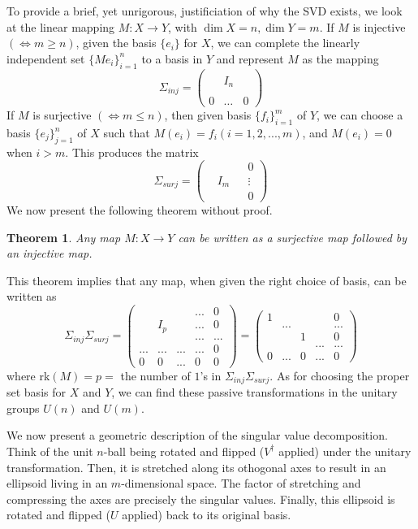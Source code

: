 \documentclass{article}
\newtheorem{theorem}{Theorem}[section]
\theoremstyle{remark}
\theoremstyle{definition}
\begin{document}
To provide a brief, yet unrigorous, justificiation of why the SVD exists, we look at the linear mapping $M: X \longrightarrow Y$, with $\dim{X} = n, \dim{Y} = m$. If $M$ is injective $(\iff m \geq n)$, given the basis $\{e_i\}$ for $X$, we can complete the linearly independent set $\{Me_i\}_{i=1}^n$ to a basis in $Y$ and represent $M$ as the mapping
\[\Sigma_{inj} = \begin{pmatrix}
&&\\
&I_n&\\
&&\\
0&\ldots &0
\end{pmatrix}\]
If $M$ is surjective $(\iff m \leq n)$, then given basis $\{f_i\}_{i=1}^m$ of $Y$, we can choose a basis $\{e_j\}_{j=1}^n$ of $X$ such that $M(e_i) = f_i (i = 1, 2, ..., m)$, and $M(e_i) = 0$ when $i > m$. This produces the matrix
\[\Sigma_{surj} = \begin{pmatrix}
&&&0\\&I_m&& \vdots \\&&&0\end{pmatrix}\]
We now present the following theorem without proof. 

\begin{theorem}
Any map $M: X \longrightarrow Y$ can be written as a surjective map followed by an injective map. 
\end{theorem}

This theorem implies that any map, when given the right choice of basis, can be written as 
\[ \Sigma_{inj} \Sigma_{surj} = \begin{pmatrix}
&&&...&0\\
&I_p&&...&0\\
&&&...&...\\
...&...&...&...&0\\
0&0&...&0&0
\end{pmatrix} = \begin{pmatrix}
1&&&&0\\
&...&&&...\\
&&1&&0\\
&&&...&...\\
0&...&0&...&0
\end{pmatrix}\]
where rk$(M) = p = $ the number of $1$'s in $\Sigma_{inj} \Sigma_{surj}$. As for choosing the proper set basis for $X$ and $Y$, we can find these passive transformations in the unitary groups $U(n)$ and $U(m)$. 

We now present a geometric description of the singular value decomposition. Think of the unit $n$-ball being rotated and flipped ($V^\dagger$ applied) under the unitary transformation. Then, it is stretched along its othogonal axes to result in an ellipsoid living in an $m$-dimensional space. The factor of stretching and compressing the axes are precisely the singular values. Finally, this ellipsoid is rotated and flipped ($U$ applied) back to its original basis. 
\end{document}
